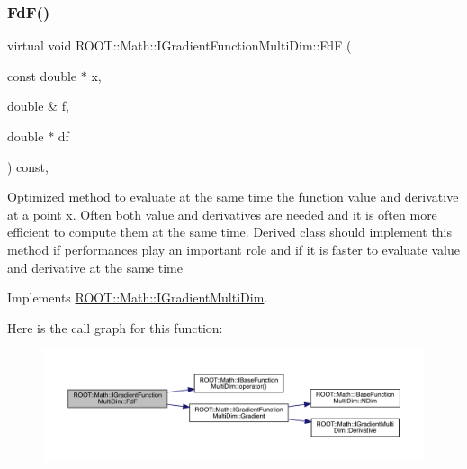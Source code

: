 \subsubsection{\texorpdfstring{FdF()}{FdF()}\hspace{0.1cm}{\footnotesize\ttfamily [1/2]}}
{\footnotesize\ttfamily virtual void R\+O\+O\+T\+::\+Math\+::\+I\+Gradient\+Function\+Multi\+Dim\+::\+FdF (\begin{DoxyParamCaption}\item[{const double $\ast$}]{x,  }\item[{double \&}]{f,  }\item[{double $\ast$}]{df }\end{DoxyParamCaption}) const\hspace{0.3cm}{\ttfamily [inline]}, {\ttfamily [virtual]}}

Optimized method to evaluate at the same time the function value and derivative at a point x. Often both value and derivatives are needed and it is often more efficient to compute them at the same time. Derived class should implement this method if performances play an important role and if it is faster to evaluate value and derivative at the same time 

Implements \mbox{\hyperlink{classROOT_1_1Math_1_1IGradientMultiDim_ad8d0e31b786327014524483a708d8f82}{R\+O\+O\+T\+::\+Math\+::\+I\+Gradient\+Multi\+Dim}}.

Here is the call graph for this function\+:
\nopagebreak
\begin{figure}[H]
\begin{center}
\leavevmode
\includegraphics[width=350pt]{da/d1a/classROOT_1_1Math_1_1IGradientFunctionMultiDim_a58cefd2806ec7b9d389911800ed60386_cgraph}
\end{center}
\end{figure}
\mbox{\label{classROOT_1_1Math_1_1IGradientFunctionMultiDim_a58cefd2806ec7b9d389911800ed60386}} 
